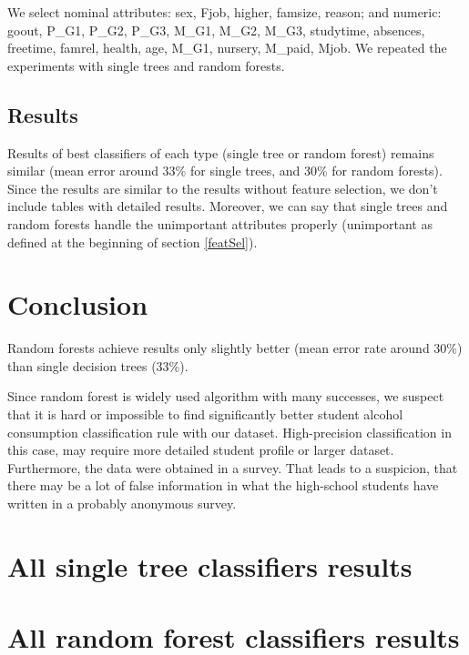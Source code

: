 \documentclass[a4paper]{article}
\begin{document}
We select nominal attributes:
sex,
Fjob,
higher,
famsize,
reason; and numeric:
goout,
P\_G1,
P\_G2,
P\_G3,
M\_G1,
M\_G2,
M\_G3,
studytime,
absences,
freetime,
famrel,
health,
age,
M\_G1,
nursery,
M\_paid,
Mjob.
We repeated the experiments with single trees and random forests.

\subsection{Results}

Results of best classifiers of each type (single tree or random forest) remains similar 
(mean error around 33\% for single trees, and 30\% for random forests).
Since the results are similar to the results without feature selection,
we don't include tables with detailed results.
Moreover, we can say that single trees and random forests handle
the unimportant attributes properly (unimportant as defined at the beginning of section \ref{featSel}).



\section{Conclusion}
Random forests achieve results only slightly better (mean error rate around 30\%)
than single decision trees (33\%).

Since random forest is widely used algorithm with many successes, we suspect
that it is hard or impossible to find significantly better
student alcohol consumption classification rule
with our dataset.
High-precision classification in this case, may require more detailed
student profile or larger dataset.
Furthermore, the data were obtained in a survey.
That leads to a suspicion, that there may be a lot of false information in
what the high-school students have written in a probably anonymous survey.





\onecolumn
\newpage
\appendix
\section{All single tree classifiers results}
% 


\newpage
\section{All random forest classifiers results}
% 

\end{document}
